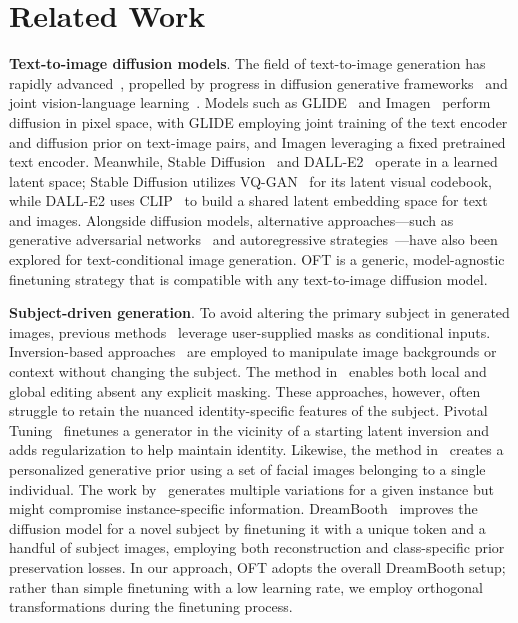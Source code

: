\section{Related Work}

\textbf{Text-to-image diffusion models}. The field of text-to-image generation has rapidly advanced~\cite{saharia2022photorealistic,ramesh2022hierarchical,rombach2022high,gu2022vector,nichol2022glide}, propelled by progress in diffusion generative frameworks~\cite{ho2020denoising,song2021score,song2021denoising,dhariwal2021diffusion} and joint vision-language learning~\cite{su2020vlbert,lu2019vilbert,radford2021learning,wang2021simvlm,li2022blip,li2023blip,alayrac2022flamingo,schuhmann2022laion}. Models such as GLIDE~\cite{nichol2022glide} and Imagen~\cite{saharia2022photorealistic} perform diffusion in pixel space, with GLIDE employing joint training of the text encoder and diffusion prior on text-image pairs, and Imagen leveraging a fixed pretrained text encoder. Meanwhile, Stable Diffusion~\cite{rombach2022high} and DALL-E2~\cite{ramesh2022hierarchical} operate in a learned latent space; Stable Diffusion utilizes VQ-GAN~\cite{esser2021taming} for its latent visual codebook, while DALL-E2 uses CLIP~\cite{radford2021learning} to build a shared latent embedding space for text and images. Alongside diffusion models, alternative approaches—such as generative adversarial networks~\cite{reed2016generative,zhang2017stackgan,xu2018attngan,li2019controllable} and autoregressive strategies~\cite{ramesh2021zero,ding2021cogview,wu2022nuwa,yuscaling}—have also been explored for text-conditional image generation. OFT is a generic, model-agnostic finetuning strategy that is compatible with any text-to-image diffusion model.

\textbf{Subject-driven generation}. To avoid altering the primary subject in generated images, previous methods~\cite{avrahami2022blended,nichol2022glide} leverage user-supplied masks as conditional inputs. Inversion-based approaches~\cite{choi2021ilvr,dhariwal2021diffusion,ramesh2022hierarchical,gal2022image} are employed to manipulate image backgrounds or context without changing the subject. The method in~\cite{hertz2022prompt} enables both local and global editing absent any explicit masking. These approaches, however, often struggle to retain the nuanced identity-specific features of the subject. Pivotal Tuning~\cite{roich2022pivotal} finetunes a generator in the vicinity of a starting latent inversion and adds regularization to help maintain identity. Likewise, the method in~\cite{nitzan2022mystyle} creates a personalized generative prior using a set of facial images belonging to a single individual. The work by~\cite{casanova2021instance} generates multiple variations for a given instance but might compromise instance-specific information. DreamBooth~\cite{ruiz2023dreambooth} improves the diffusion model for a novel subject by finetuning it with a unique token and a handful of subject images, employing both reconstruction and class-specific prior preservation losses. In our approach, OFT adopts the overall DreamBooth setup; rather than simple finetuning with a low learning rate, we employ orthogonal transformations during the finetuning process.

